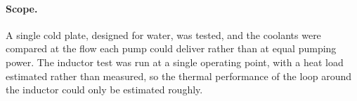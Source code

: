 \paragraph{Scope.} A single cold plate, designed for water, was tested, and the
coolants were compared at the flow each pump could deliver rather than at equal
pumping power. The inductor test was run at a single operating point, with a
heat load estimated rather than measured, so the
thermal performance of the loop around the inductor could only be estimated
roughly.



